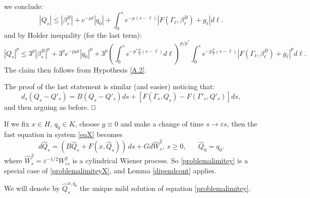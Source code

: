 \documentclass[reqno,a4paper,11 pt]{article}
\def \E {\mathbb{E}}
\def \e {\varepsilon}
\numberwithin{equation}{section}
\def\finedim{{\hfill\hbox{\enspace${ \square}$}} \smallskip}    %
\def\sqr#1#2{{\vcenter{\vbox{\hrule height .#2pt
     \hbox{\vrule width .#2pt height#1pt \kern#1pt \vrule
     width .#2pt} \hrule height .#2pt}}}}
\def\square{\mathchoice\sqr54\sqr54\sqr{4.1}3\sqr{3.5}3}
\begin{document}
we conclude:
$$|Q_s|\leq |\beta^B_s|+ e^{-\mu t}|q_0|+\int_0^s e^{-\mu(s- \ell)}\left|F(\Gamma_{\ell},\beta^B_{\ell})+g_{\ell}\right| d\ell. $$
and by Holder inequality (for the last term):
$$|Q_s|^p\leq 3^p |\beta^B_s|^p+ 3^p e^{-p\mu t}|q_0|^p+ 3^p\left(\int_0^s e^{-p^*\frac{\mu}{2}(s- \ell)}d \ell\right)^{p/p^*} \int_0^s e^{-p\frac{\mu}{2}(s- \ell)}|F(\Gamma_{\ell},\beta^B_{\ell})+g_{\ell}|^p d\ell. $$
The claim then follows from Hypothesis \ref{A.2}.

The proof of the last statement is similar (and easier) noticing that:
$$d_s(Q_s - Q'_s)=B(Q_s - Q'_s)ds+[F(\Gamma_s,Q_s)-F(\Gamma'_s,Q'_s)]ds, $$
and then arguing as before.
\finedim

\noindent
If we fix $x\in H$, $q_0\in K$, choose $g\equiv 0$  and make a change of time $ s \to \e s$, then the fast equation in system \eqref{eqX} becomes 
 \begin{equation} \label{problemalimitey}
d\hat{Q}_s=(B\hat{Q}_s+ F(x,\hat{Q}_s))\,ds + Gd\hat{W}^2_s, \ s\geq 0,
\hspace{20pt} \hat{Q}_0= q_0.
\end{equation}
where  $\hat{W}_s^{2}={\e}^{-1/2}{W}_{\e s }^{2}$
is a cylindrical Wiener process.
 So \eqref{problemalimitey} is a special case of \eqref{problemalimiteyX}, and Lemma \ref{dipendcont}
applies. 

 We will denote by $\hat{Q}^{x,q_0}_s$ the unique mild solution of equation \eqref{problemalimitey}.
\end{document}
